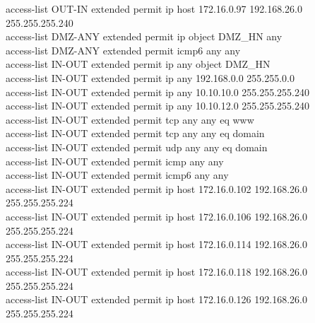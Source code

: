 \documentclass[12pt,a4paper]{report}
\begin{document}
{\hspace*{1cm}access-list OUT-IN extended permit ip host 172.16.0.97 192.168.26.0 255.255.255.240\\
\hspace*{1cm}access-list DMZ-ANY extended permit ip object DMZ\_HN any\\
\hspace*{1cm}access-list DMZ-ANY extended permit icmp6 any any \\
\hspace*{1cm}access-list IN-OUT extended permit ip any object DMZ\_HN\\
\hspace*{1cm}access-list IN-OUT extended permit ip any 192.168.0.0 255.255.0.0 \\
\hspace*{1cm}access-list IN-OUT extended permit ip any 10.10.10.0 255.255.255.240\\
\hspace*{1cm}access-list IN-OUT extended permit ip any 10.10.12.0 255.255.255.240 \\
\hspace*{1cm}access-list IN-OUT extended permit tcp any any eq www\\
\hspace*{1cm}access-list IN-OUT extended permit tcp any any eq domain \\
\hspace*{1cm}access-list IN-OUT extended permit udp any any eq domain \\
\hspace*{1cm}access-list IN-OUT extended permit icmp any any\\
\hspace*{1cm}access-list IN-OUT extended permit icmp6 any any\\
\hspace*{1cm}access-list IN-OUT extended permit ip host 172.16.0.102 192.168.26.0 255.255.255.224\\
\hspace*{1cm}access-list IN-OUT extended permit ip host 172.16.0.106 192.168.26.0 255.255.255.224\\
\hspace*{1cm}access-list IN-OUT extended permit ip host 172.16.0.114 192.168.26.0 255.255.255.224\\
\hspace*{1cm}access-list IN-OUT extended permit ip host 172.16.0.118 192.168.26.0 255.255.255.224\\
\hspace*{1cm}access-list IN-OUT extended permit ip host 172.16.0.126 192.168.26.0 255.255.255.224\\
}
\end{document}

